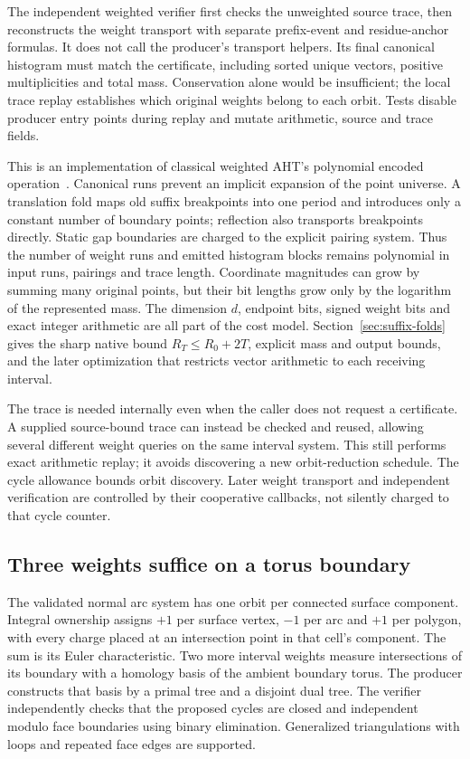 The independent weighted verifier first checks the unweighted source trace,
then reconstructs the weight transport with separate prefix-event and
residue-anchor formulas. It does not call the producer's transport helpers.
Its final canonical histogram must match the certificate, including sorted
unique vectors, positive multiplicities and total mass. Conservation alone
would be insufficient; the local trace replay establishes which original
weights belong to each orbit. Tests disable producer entry points during
replay and mutate arithmetic, source and trace fields.

This is an implementation of classical weighted AHT's polynomial encoded
operation~\cite[Theorem 16]{aht-orbits}. Canonical runs prevent an implicit
expansion of the point universe. A translation fold maps old suffix breakpoints
into one period and introduces only a constant number of boundary points;
reflection also transports breakpoints directly. Static gap boundaries are
charged to the explicit pairing system. Thus the number of weight runs and
emitted histogram blocks remains polynomial in input runs, pairings and
trace length. Coordinate magnitudes can grow by summing many original points,
but their bit lengths grow only by the logarithm of the represented mass.
The dimension $d$, endpoint bits, signed weight bits and exact integer
arithmetic are all part of the cost model. Section~\ref{sec:suffix-folds}
gives the sharp native bound $R_T\le R_0+2T$, explicit mass and output
bounds, and the later optimization that restricts vector arithmetic to each
receiving interval.

The trace is needed internally even when the caller does not request a
certificate. A supplied source-bound trace can instead be checked and reused,
allowing several different weight queries on the same interval system.
This still performs exact arithmetic replay; it avoids discovering a new
orbit-reduction schedule. The cycle allowance bounds orbit discovery. Later
weight transport and independent verification are controlled by their
cooperative callbacks, not silently charged to that cycle counter.

\subsection{Three weights suffice on a torus boundary}

The validated normal arc system has one orbit per connected surface component.
Integral ownership assigns $+1$ per surface vertex, $-1$ per arc and $+1$ per
polygon, with every charge placed at an intersection point in that cell's
component. The sum is its Euler characteristic. Two more interval weights
measure intersections of its boundary with a homology basis of the ambient
boundary torus. The producer constructs that basis by a primal tree and a
disjoint dual tree. The verifier independently checks that the proposed cycles
are closed and independent modulo face boundaries using binary elimination.
Generalized triangulations with loops and repeated face edges are supported.

